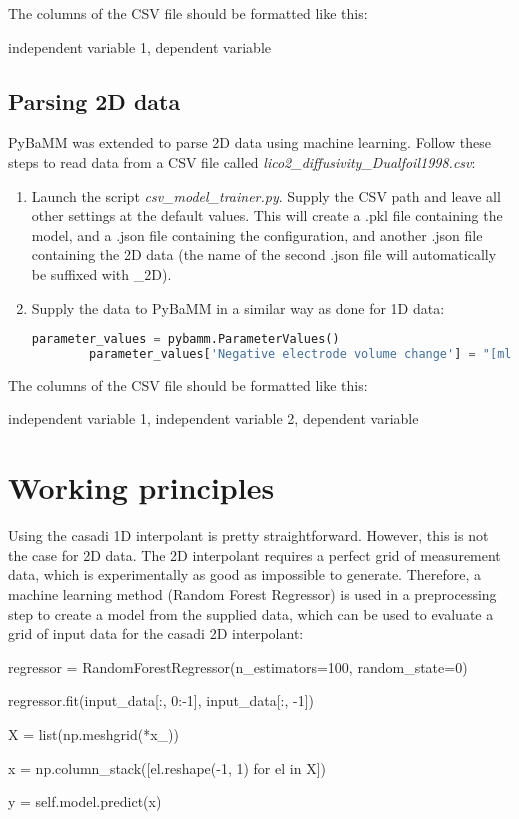 \documentclass[]{report}
\begin{document}
The columns of the CSV file should be formatted like this:

\begin{python}
independent variable 1, dependent variable
\end{python}

\subsection{Parsing 2D data}

PyBaMM was extended to parse 2D data using machine learning. Follow these steps to read data from a CSV file called \textit{lico2\_diffusivity\_Dualfoil1998.csv}:

\begin{enumerate}
\item Launch the script \textit{csv\_model\_trainer.py}. Supply the CSV path and leave all other settings at the default values. This will create a .pkl file containing the model, and a .json file containing the configuration, and another .json file containing the 2D data (the name of the second .json file will automatically be suffixed with \_2D).
\item Supply the data to PyBaMM in a similar way as done for 1D data:
	\begin{lstlisting}[language=python]
		parameter_values = pybamm.ParameterValues()
		parameter_values['Negative electrode volume change'] = "[ml data]lico2_diffusivity_Dualfoil1998_2D"
	\end{lstlisting}
\end{enumerate}

The columns of the CSV file should be formatted like this:

\begin{python}
independent variable 1, independent variable 2, dependent variable
\end{python}

\section{Working principles}

Using the casadi 1D interpolant is pretty straightforward. However, this is not the case for 2D data. The 2D interpolant requires a perfect grid of measurement data, which is experimentally as good as impossible to generate. Therefore, a machine learning method (Random Forest Regressor) is used in a preprocessing step to create a model from the supplied data, which can be used to evaluate a grid of input data for the casadi 2D interpolant:

\begin{python}
regressor = RandomForestRegressor(n_estimators=100, random_state=0)

regressor.fit(input_data[:, 0:-1], input_data[:, -1])
\end{python}

\begin{python}
X = list(np.meshgrid(*x_))

x = np.column_stack([el.reshape(-1, 1) for el in X])

y = self.model.predict(x)
\end{python}
\end{document}
